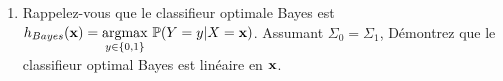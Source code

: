 \documentclass[11pt,french,english]{article}
\begin{document}
\begin{enumerate}
\begin{enumerate}
\item {}%
{Rappelez-vous que le classifieur optimale Bayes est $h_{Bayes}(\mathbf{x}) = \underset{y \in \{0,1\}}{\mathrm{argmax}}\ \mathbb{P}(Y=y|X=\mathbf{x})$. Assumant $\Sigma_0 = \Sigma_1$, Démontrez que le classifieur optimal Bayes est linéaire en $\mathbf{x}$. }
\end{enumerate}
\end{enumerate}

\end{document}
